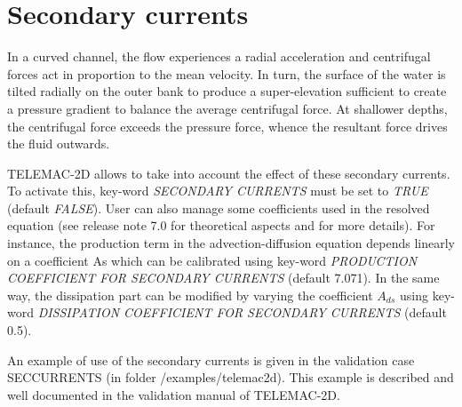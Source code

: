 


\chapter{ Secondary currents}

 In a curved channel, the flow experiences a radial acceleration and centrifugal forces act in proportion to the mean velocity.  
In turn, the surface of the water is tilted radially on the outer bank to produce a super-elevation sufficient to create a pressure gradient 
to balance the average centrifugal force.  At shallower depths, the centrifugal force exceeds the pressure force, whence the resultant force 
drives the fluid outwards.

TELEMAC-2D allows to take into account the effect of these secondary currents. To activate this, key-word \textit{SECONDARY CURRENTS} must be set to \textit{TRUE} 
(default \textit{FALSE}). User can also manage some coefficients used in the resolved equation (see release note 7.0 for theoretical aspects and 
for more details). For instance, the production term in the advection-diffusion equation depends linearly on a coefficient As which can be 
calibrated using key-word\textit{ PRODUCTION COEFFICIENT FOR SECONDARY CURRENTS} (default 7.071).  In the same way, 
the dissipation part can be modified by varying the coefficient $A_{ds}$ using key-word \textit{ DISSIPATION COEFFICIENT FOR SECONDARY CURRENTS} 
(default 0.5).

 An example of use of the secondary currents is given in the validation case SECCURRENTS (in folder /examples/telemac2d). 
This example is described and well documented in the validation manual of TELEMAC-2D.

